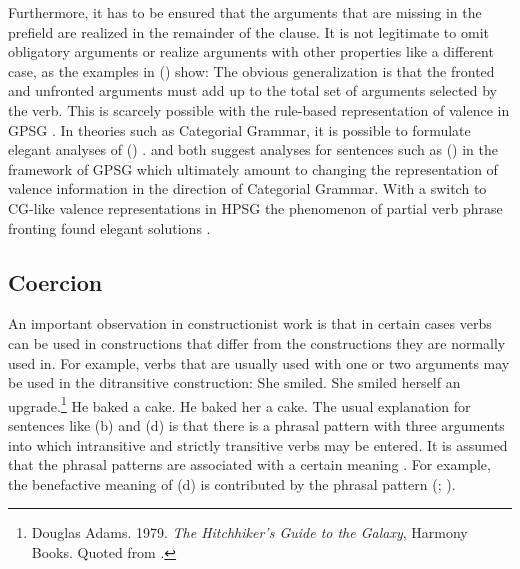 \documentclass[output=paper]{langsci/langscibook}
\begin{document}
Furthermore, it has to be ensured that the arguments that are
missing in the prefield are realized in the remainder of the clause. It is not legitimate to omit
obligatory arguments or realize arguments with other properties like a different case, as the
examples in () show:
\eal
{}
\zl
The obvious generalization is that the fronted and unfronted arguments must add up to the total
set of arguments selected by the verb. This is scarcely possible with the rule-based
representation of valence in GPSG \citep{Nerbonne86a,Johnson86a}. In theories such as Categorial
Grammar, it is possible to formulate elegant analyses of () 
\citep{Geach70a}. \citet{Nerbonne86a} and \citet{Johnson86a} both suggest analyses for sentences
such as () in the framework of GPSG which
ultimately amount to changing the representation of valence information in the direction of
Categorial Grammar.
With a switch to CG-like valence representations in HPSG the phenomenon of partial verb phrase
fronting found elegant solutions \parencites[Section~4]{HoehleSpuren}{Mueller96a}{Meurers99a}.


\subsection{Coercion}
\label{sec-coercion}

An important observation in constructionist work is that in certain cases verbs can be used in
constructions that differ from the constructions they are normally used in. For example, verbs that are usually
used with one or two arguments may be used in the ditransitive construction:
\eal
\ex She smiled.
\ex She smiled herself an upgrade.\footnote{
Douglas Adams. 1979. \emph{The Hitchhiker’s Guide to the Galaxy}, Harmony Books. Quoted from
.
}
\ex He baked a cake.
\ex He baked her a cake.
\zl
The usual explanation for sentences like (b) and (d) is that there is a phrasal
pattern with three arguments into which intransitive and strictly transitive verbs may be
entered. It is assumed that the phrasal patterns are associated with a certain meaning \citep{Goldberg96a,GJ2004a}. For example,
the benefactive meaning of (d) is contributed by the phrasal pattern
(\citealt[Section~6]{Goldberg96a}; \citealt*[]{AGT2014a}).
\end{document}
